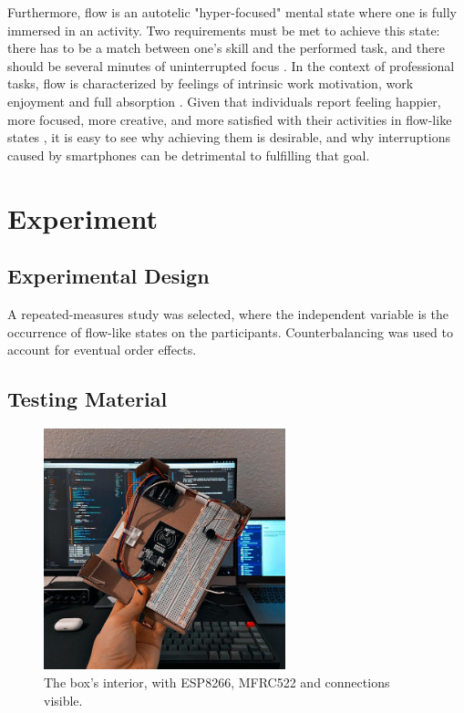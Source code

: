 \documentclass[format=acmsmall]{acmart}
\begin{document}
Furthermore, flow is an autotelic "hyper-focused" mental state where one is fully immersed in an activity. Two requirements must be met to achieve this state: there has to be a match between one's skill and the performed task, and there should be several minutes of uninterrupted focus \cite{csikszentmihalyi_1990}. In the context of professional tasks, flow is characterized by feelings of intrinsic work motivation, work enjoyment and full absorption \cite{bakker_2005}. Given that individuals report feeling happier, more focused, more creative, and more satisfied with their activities in flow-like states \cite{csikszentmihalyi_lefevre_1989}, it is easy to see why achieving them is desirable, and why interruptions caused by smartphones can be detrimental to fulfilling that goal.

\section{Experiment}

\subsection{Experimental Design}

A repeated-measures study was selected, where the independent variable is the occurrence of flow-like states on the participants. Counterbalancing was used to account for eventual order effects.

\subsection{Testing Material}

\begin{figure}
    \centering
    \includegraphics[height=7cm]{box_1}
    \caption{The box's interior, with ESP8266, MFRC522 and connections visible.}
    \label{fig:box_1}
\end{figure}
\end{document}
